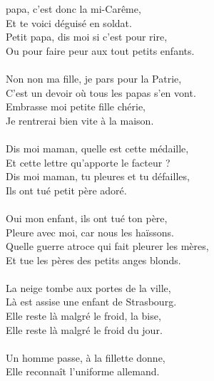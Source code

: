 
 papa, c'est donc la mi-Carême,
\\Et te voici déguisé en soldat.
\\Petit papa, dis moi si c'est pour rire,
\\Ou pour faire peur aux tout petits enfants. \bissimple
\\\\Non non ma fille, je pars pour la Patrie,
\\C'est un devoir où tous les papas s'en vont.
\\Embrasse moi petite fille chérie,
\\Je rentrerai bien vite à la maison. \bissimple
\\\\Dis moi maman, quelle est cette médaille,
\\Et cette lettre qu'apporte le facteur ?
\\Dis moi maman, tu pleures et tu défailles,
\\Ils ont tué petit père adoré. \bissimple
\\\\Oui mon enfant, ils ont tué ton père,
\\Pleure avec moi, car nous les haïssons.
\\Quelle guerre atroce qui fait pleurer les mères,
\\Et tue les pères des petits anges blonds. \bissimple
\\\\La neige tombe aux portes de la ville,
\\Là est assise une enfant de Strasbourg.
\\Elle reste là malgré le froid, la bise,
\\Elle reste là malgré le froid du jour. \bissimple
\\\\Un homme passe, à la fillette donne,
\\Elle reconnaît l'uniforme allemand.
